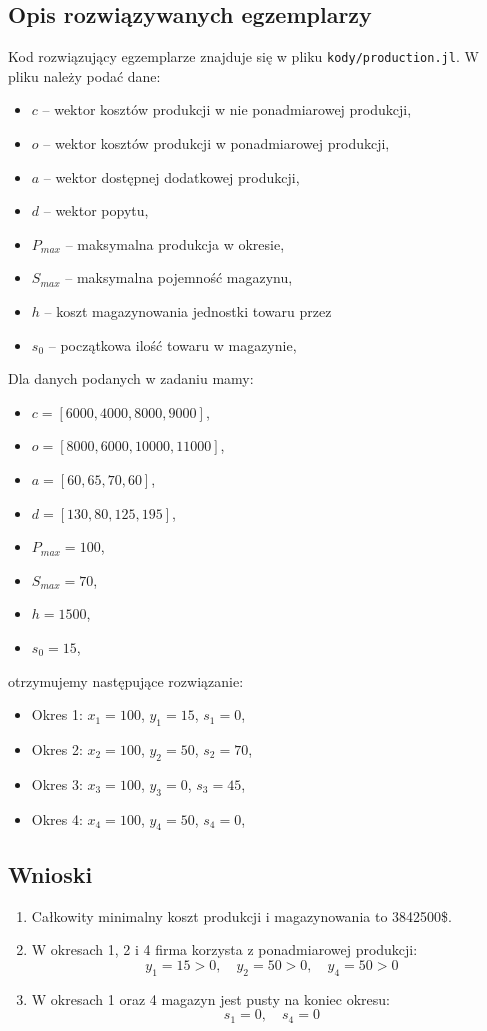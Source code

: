 \documentclass[11pt,a4paper]{article}
\numberwithin{equation}{section}
\begin{document}
\subsection{Opis rozwiązywanych egzemplarzy}
Kod rozwiązujący egzemplarze znajduje się w pliku \texttt{kody/production.jl}. W pliku należy podać dane:
\begin{itemize}
    \item $c$ -- wektor kosztów produkcji w nie ponadmiarowej produkcji,
    \item $o$ -- wektor kosztów produkcji w ponadmiarowej produkcji,
    \item $a$ -- wektor dostępnej dodatkowej produkcji,
    \item $d$ -- wektor popytu,
    \item $P_{max}$ -- maksymalna produkcja w okresie,
    \item $S_{max}$ -- maksymalna pojemność magazynu,
    \item $h$ -- koszt magazynowania jednostki towaru przez
    \item $s_0$ -- początkowa ilość towaru w magazynie,
\end{itemize}
Dla danych podanych w zadaniu mamy:
\begin{itemize}
    \item $c = [6000, 4000, 8000, 9000]$,
    \item $o = [8000, 6000, 10000, 11000]$,
    \item $a = [60, 65, 70, 60]$,
    \item $d = [130, 80, 125, 195]$,
    \item $P_{max} = 100$,
    \item $S_{max} = 70$,
    \item $h = 1500$,
    \item $s_0 = 15$,
\end{itemize}
otrzymujemy następujące rozwiązanie:
\begin{itemize}
    \item Okres 1: $x_1 = 100$, $y_1 = 15$, $s_1 = 0$,
    \item Okres 2: $x_2 = 100$, $y_2 = 50$, $s_2 = 70$,
    \item Okres 3: $x_3 = 100$, $y_3 = 0$, $s_3 = 45$,
    \item Okres 4: $x_4 = 100$, $y_4 = 50$, $s_4 = 0$,
\end{itemize}
\subsection{Wnioski}
\begin{enumerate}[label=(\alph*)]
    \item Całkowity minimalny koszt produkcji i magazynowania to \num{3842500}\$.
    \item W okresach 1, 2 i 4 firma korzysta z ponadmiarowej produkcji:
        \[
            y_1 = 15 > 0, \quad y_2 = 50 > 0, \quad y_4 = 50 > 0
        \]
    \item W okresach 1 oraz 4 magazyn jest pusty na koniec okresu:
        \[
            s_1 = 0, \quad s_4 = 0
        \]
\end{enumerate}
\end{document}
